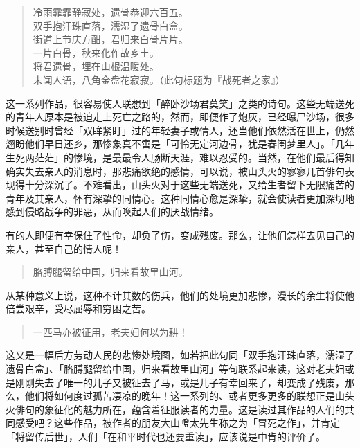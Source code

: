 {    \begin{quote}
        冷雨霏霏静寂处，遗骨恭迎六百五。\\
        双手抱汗珠直落，濡湿了遗骨白盒。\\
        街道上节庆方酣，君归来白骨片片。\\
        一片白骨，秋来化作故乡土。\\
        将君遗骨，埋在山根温暖处。\\
        未闻人语，八角金盘花寂寂。（此句标题为『战死者之家』）
    \end{quote}

    这一系列作品，很容易使人联想到「醉卧沙场君莫笑」之类的诗句。这些无端送死的青年人原本是被迫走上死亡之路的，然而，即便作了炮灰，已经曝尸沙场，很多时候送别时曾经「双眸紧盯」过的年轻妻子或情人，还当他们依然活在世上，仍然翘盼他们早日还乡，那惨象真不啻是「可怜无定河边骨，犹是春闺梦里人」。「几年生死两茫茫」的惨境，是最最令人肠断天涯，难以忍受的。当然，在他们最后得知确实失去亲人的消息时，那悲痛欲绝的感情，可以说，被山头火的寥寥几首俳句表现得十分深沉了。不难看出，山头火对于这些无端送死，又给生者留下无限痛苦的青年及其亲人，怀有深挚的同情心。这种同情心愈是深挚，就会使读者更加深切地感到侵略战争的罪恶，从而唤起人们的厌战情绪。

    有的人即便有幸保住了性命，却负了伤，变成残废。那么，让他们怎样去见自己的亲人，甚至自己的情人呢！

    \begin{quote}
        胳膊腿留给中国，归来看故里山河。
    \end{quote}

    从某种意义上说，这种不计其数的伤兵，他们的处境更加悲惨，漫长的余生将使他倍尝艰辛，受尽屈辱和穷困之苦。

    \begin{quote}
        一匹马亦被征用，老夫妇何以为耕！
    \end{quote}

    这又是一幅后方劳动人民的悲惨处境图，如若把此句同「双手抱汗珠直落，濡湿了遗骨白盒」、「胳膊腿留给中国，归来看故里山河」等句联系起来读，这对老夫妇或是刚刚失去了唯一的儿子又被征去了马，或是儿子有幸回来了，却变成了残废，那么，他们将如何度过孤苦凄凉的晚年！这一系列的、或者更多更多的联想正是山头火俳句的象征化的魅力所在，蕴含着征服读者的力量。这是读过其作品的人们的共同感受吧？这些作品，被作者的朋友大山噔太先生称之为「冒死之作」，并肯定「将留传后世」，人们「在和平时代也还要重读」\footnotemark[13]，应该说是中肯的评价了。


}
